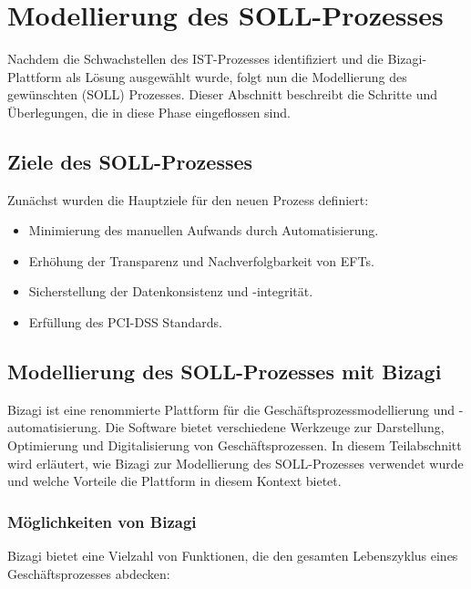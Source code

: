 \documentclass[12pt, a4paper]{article}
\begin{document}
\section{Modellierung des SOLL-Prozesses}

Nachdem die Schwachstellen des IST-Prozesses identifiziert und die Bizagi-Plattform als Lösung ausgewählt wurde, folgt nun die Modellierung des gewünschten (SOLL) Prozesses. 
Dieser Abschnitt beschreibt die Schritte und Überlegungen, die in diese Phase eingeflossen sind.

\subsection{Ziele des SOLL-Prozesses}

Zunächst wurden die Hauptziele für den neuen Prozess definiert:
\begin{itemize}
\item Minimierung des manuellen Aufwands durch Automatisierung.
\item Erhöhung der Transparenz und Nachverfolgbarkeit von EFTs.
\item Sicherstellung der Datenkonsistenz und -integrität.
\item Erfüllung des PCI-DSS Standards.
\end{itemize}


\subsection{Modellierung des SOLL-Prozesses mit Bizagi}

Bizagi ist eine renommierte Plattform für die Geschäftsprozessmodellierung und -automatisierung. Die Software bietet verschiedene Werkzeuge zur Darstellung, 
Optimierung und Digitalisierung von Geschäftsprozessen. In diesem Teilabschnitt wird erläutert, wie Bizagi zur Modellierung des SOLL-Prozesses verwendet wurde und welche 
Vorteile die Plattform in diesem Kontext bietet.

\subsubsection{Möglichkeiten von Bizagi}

Bizagi bietet eine Vielzahl von Funktionen, die den gesamten Lebenszyklus eines Geschäftsprozesses abdecken:
\end{document}
